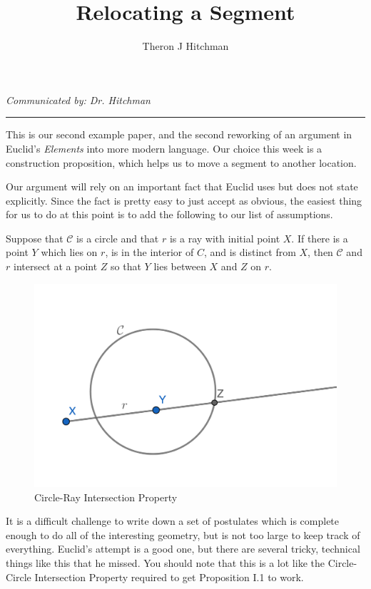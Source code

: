 \documentclass[12pt]{article}
\newenvironment{postulate}[1][Postulate]{\begin{trivlist}
\item[\hskip \labelsep {\bfseries #1}]}{\end{trivlist}}
\begin{document}
 
 
\title{Relocating a Segment} 
\author{Theron J Hitchman}  
\maketitle

{%
\centering
\textit{Communicated by: Dr. Hitchman}
\par
}
\hrule
\vspace{.2in}


This is our second example paper, and the second reworking of an argument in Euclid's \emph{Elements} into more modern language. Our choice this week is a construction proposition, which helps us to move a segment to another location.

Our argument will rely on an important fact that Euclid uses but does not state explicitly. Since the fact is pretty easy to just accept as obvious, the easiest thing for us to do at this point is to add the following to our list of assumptions. 

\begin{postulate}[Circle-Ray Intersection Property] Suppose that $\mathcal{C}$ is a circle and that $r$ is a ray with initial point $X$. If there is a point $Y$ which lies on $r$, is in the interior of $C$, and is distinct from $X$, then $\mathcal{C}$ and $r$ intersect at a point $Z$ so that $Y$ lies between $X$ and $Z$ on $r$.
\end{postulate}

\begin{figure}[ht]
\centering
\includegraphics[width=.35\textwidth]{example2-postulate.png}
\caption{Circle-Ray Intersection Property}
\end{figure}

It is a difficult challenge to write down a set of postulates which is complete enough to do all of the interesting geometry, but is not too large to keep track of everything. Euclid's attempt is a good one, but there are several tricky, technical things like this that he missed. You should note that this is a lot like the Circle-Circle Intersection Property required to get Proposition I.1 to work.
\end{document}
